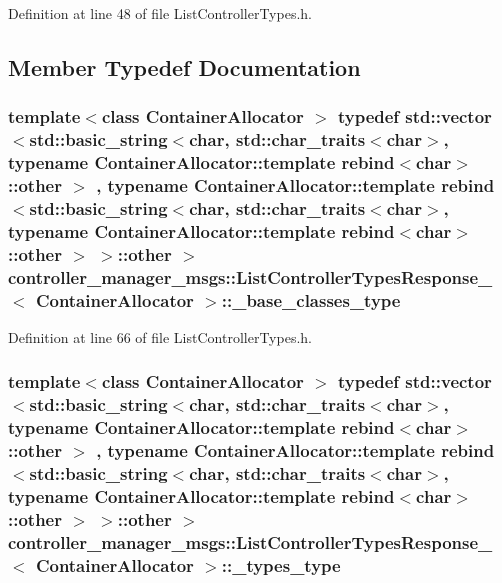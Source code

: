 \-Definition at line 48 of file \-List\-Controller\-Types.\-h.



\subsection{\-Member \-Typedef \-Documentation}
\subsubsection[{\-\_\-base\-\_\-classes\-\_\-type}]{\setlength{\rightskip}{0pt plus 5cm}template$<$class Container\-Allocator $>$ typedef std\-::vector$<$std\-::basic\-\_\-string$<$char, std\-::char\-\_\-traits$<$char$>$, typename \-Container\-Allocator\-::template rebind$<$char$>$\-::other $>$ , typename \-Container\-Allocator\-::template rebind$<$std\-::basic\-\_\-string$<$char, std\-::char\-\_\-traits$<$char$>$, typename \-Container\-Allocator\-::template rebind$<$char$>$\-::other $>$ $>$\-::other $>$ {\bf controller\-\_\-manager\-\_\-msgs\-::\-List\-Controller\-Types\-Response\-\_\-}$<$ \-Container\-Allocator $>$\-::{\bf \-\_\-base\-\_\-classes\-\_\-type}}\label{structcontroller__manager__msgs_1_1ListControllerTypesResponse___aefb877ceb9ffd79e8b4a2e1ed922abf3}


\-Definition at line 66 of file \-List\-Controller\-Types.\-h.

\subsubsection[{\-\_\-types\-\_\-type}]{\setlength{\rightskip}{0pt plus 5cm}template$<$class Container\-Allocator $>$ typedef std\-::vector$<$std\-::basic\-\_\-string$<$char, std\-::char\-\_\-traits$<$char$>$, typename \-Container\-Allocator\-::template rebind$<$char$>$\-::other $>$ , typename \-Container\-Allocator\-::template rebind$<$std\-::basic\-\_\-string$<$char, std\-::char\-\_\-traits$<$char$>$, typename \-Container\-Allocator\-::template rebind$<$char$>$\-::other $>$ $>$\-::other $>$ {\bf controller\-\_\-manager\-\_\-msgs\-::\-List\-Controller\-Types\-Response\-\_\-}$<$ \-Container\-Allocator $>$\-::{\bf \-\_\-types\-\_\-type}}\label{structcontroller__manager__msgs_1_1ListControllerTypesResponse___a4bb61617c93b531b662eb005e0df7a5a}


